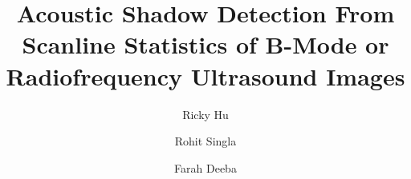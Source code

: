 \documentclass[preprint,5p]{elsarticle}
\begin{document}
\begin{frontmatter}



\title{Acoustic Shadow Detection From Scanline Statistics of B-Mode or Radiofrequency Ultrasound Images}






\author[Affil1]{Ricky Hu}
\author[Affil2]{Rohit Singla}
\author[Affil1]{Farah Deeba }

\address[Affil1]{Robotics and Control Laboratory, Department of Electrical and Computer Engineering, University of British Columbia, Vancouver, Canada}



\end{frontmatter}
\end{document}
